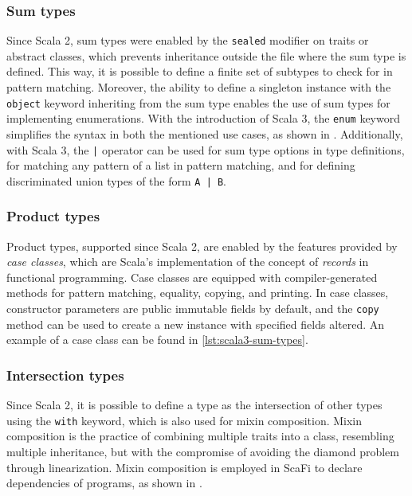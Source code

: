 \subsubsection{Sum types}

Since Scala 2, sum types were enabled by the \texttt{sealed} modifier on traits or abstract classes, which prevents inheritance outside the file where the sum type is defined.
%
This way, it is possible to define a finite set of subtypes to check for in pattern matching.
%
Moreover, the ability to define a singleton instance with the \texttt{object} keyword inheriting from the sum type enables the use of sum types for implementing enumerations.
%
With the introduction of Scala 3, the \texttt{enum} keyword simplifies the syntax in both the mentioned use cases, as shown in .
%
Additionally, with Scala 3, the \texttt{|} operator can be used for sum type options in type definitions, for matching any pattern of a list in pattern matching, and for defining discriminated union types of the form \texttt{A | B}.



\subsubsection{Product types}

Product types, supported since Scala 2, are enabled by the features provided by \textit{case classes}, which are Scala's implementation of the concept of \textit{records} in functional programming.
%
Case classes are equipped with compiler-generated methods for pattern matching, equality, copying, and printing.
%
In case classes, constructor parameters are public immutable fields by default, and the \texttt{copy} method can be used to create a new instance with specified fields altered.
%
An example of a case class can be found in \cref{lst:scala3-sum-types}.

\subsubsection{Intersection types}

Since Scala 2, it is possible to define a type as the intersection of other types using the \texttt{with} keyword, which is also used for mixin composition.
%
Mixin composition is the practice of combining multiple traits into a class, resembling multiple inheritance, but with the compromise of avoiding the diamond problem through linearization\cite{scala-patterns}.
%
Mixin composition is employed in ScaFi to declare dependencies of programs, as shown in .

